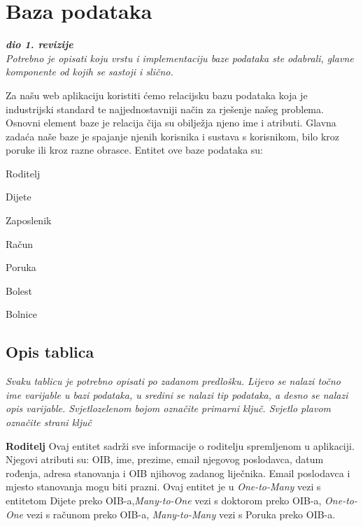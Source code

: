 		  	
		  

	
		

		

				
		\section{Baza podataka}
			
			\textbf{\textit{dio 1. revizije}}\\
			
		\textit{Potrebno je opisati koju vrstu i implementaciju baze podataka ste odabrali, glavne komponente od kojih se sastoji i slično.}
		
		Za našu web aplikaciju koristiti ćemo relacijsku bazu podataka koja je industrijski standard te najjednostavniji način za rješenje našeg problema. Osnovni element baze je relacija čija su obilježja njeno ime i atributi. Glavna zadaća naše baze je spajanje njenih korisnika i sustava s korisnikom, bilo kroz poruke ili kroz razne obrasce.
		Entitet ove baze podataka su:
		
			\begin{packed_item}
				\item Roditelj
				\item Dijete
				\item Zaposlenik
				\item Račun
				\item Poruka
				\item Bolest
				\item Bolnice
			\end{packed_item}
		
		
			\subsection{Opis tablica}
			

				\textit{Svaku tablicu je potrebno opisati po zadanom predlošku. Lijevo se nalazi točno ime varijable u bazi podataka, u sredini se nalazi tip podataka, a desno se nalazi opis varijable. Svjetlozelenom bojom označite primarni ključ. Svjetlo plavom označite strani ključ}
				
				
				\textbf{Roditelj} Ovaj entitet sadrži sve informacije o roditelju spremljenom u aplikaciji. Njegovi atributi su: OIB, ime, prezime, email njegovog poslodavca, datum rođenja, adresa stanovanja i OIB njihovog zadanog liječnika. Email poslodavca i mjesto stanovanja mogu biti prazni. Ovaj entitet je u \textit{One-to-Many} vezi s entitetom Dijete preko OIB-a,\textit{Many-to-One} vezi s doktorom preko OIB-a, \textit{One-to-One} vezi s računom preko OIB-a, \textit{Many-to-Many} vezi s Poruka preko OIB-a.
				
